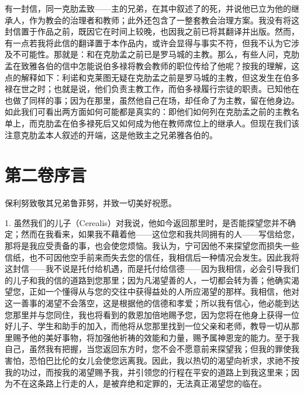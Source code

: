 有一封信，同一克肋孟致——主的兄弟，在其中叙述了的死，并说他已立为他的继承人，作为教会的治理者和教师；此外还包含了一整套教会治理方案。我没有将这封信置于作品之前，既因它在时间上较晚，也因我之前已将其翻译并出版。然而，有一点若我将此信的翻译置于本作品内，或许会显得与事实不符，但我不认为它涉及不可能性。那就是：和在克肋孟之前已是罗马城的主教。那么，有些人问，克肋孟在致雅各伯的信中怎能说伯多禄将教会教师的职位传给了他呢？按我的理解，这点的解释如下：利诺和克莱图无疑在克肋孟之前是罗马城的主教，但这发生在伯多禄在世之时；也就是说，他们负责主教工作，而伯多禄履行宗徒的职责。已知他在也做了同样的事；因为在那里，虽然他自己在场，却任命了为主教，留在他身边。如此我们可看出两方面如何可能都是真实的：即他们如何列在克肋孟之前的主教名单上，而克肋孟在伯多禄死后又如何成为他在教师席位上的继承人。但现在我们该注意克肋孟本人叙述的开端，这是他致主之兄弟雅各伯的。\par


\section{第二卷序言}

\par

保利努致敬其兄弟鲁菲努，并致一切美好祝愿。\par

1. 虽然我们的儿子（Cerealis）对我说，他如今返回那里时，是否能探望您并不确定；然而在我看来，如果我不藉着他——这位您和我共同拥有的人——写信给您，那将是我应受责备的事，也会使您烦恼。我认为，宁可因他不来探望您而损失一些信纸，也不可因他空手前来而失去您的信任，我相信后一种情况会发生。因此我将这封信——我不说是托付给机遇，而是托付给信德——因为我相信，必会引导我们的儿子和我的信的道路到您那里；因为凡渴望善的人，一切都会转为善；他确实渴望您，正如一个懂得从与您的交往中获得益处的人所应渴望的那样。我相信，他对这一善事的渴望不会落空，这是根据他的信德和孝爱；所以我有信心，他必能到达您那里并与您同住，我也将看到的救恩加倍地赐予您，因为您将在他身上获得一位好儿子、学生和助手的加入，而他将从您那里找到一位父亲和老师，教导一切从那里赐予他的美好事物，将加强他祈祷的效能和力量，赐予属神恩宠的能力。至于我自己，虽然我有把握，当您返回东方时，您不会不愿意前来探望我；但我的罪使我害怕，恐怕巴比伦的女儿会使您远离我。因此，我以热切的渴望向祈求，求祂不按我的功过，而按我的渴望赐予我，并引领您的行程在平安的道路上到我这里来；因为不在这条路上行走的人，是被弃绝和定罪的，无法真正渴望您的临在。\par

